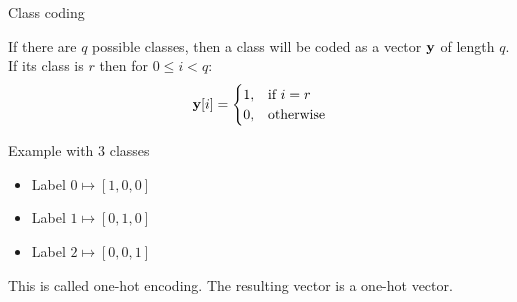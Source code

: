 \documentclass[xcolor=pdftex,dvipsnames,table,mathserif,aspectratio=169]{beamer}
\begin{document}
\begin{frame}{Class coding}

  If there are $q$ possible classes, then a class will be coded as a vector $\mathbf{y}$ of length $q$. If its class is $r$  then for $0 \leq i < q$:
  \[
  \mathbf{y}[i] =
  \begin{cases}
    1, & \text{if}\ i=r \\
    0, & \text{otherwise}
  \end{cases}
  \]

  \begin{block}{Example with $3$ classes}
    \begin{itemize}
    \item
      Label $0 \longmapsto [1,0,0]$
    \item
      Label $1 \longmapsto [0,1,0]$
    \item
      Label $2 \longmapsto [0,0,1]$
    \end{itemize}
  \end{block}

  This is called \alert{one-hot encoding}. The resulting vector is a one-hot vector.

\end{frame}
\end{document}
